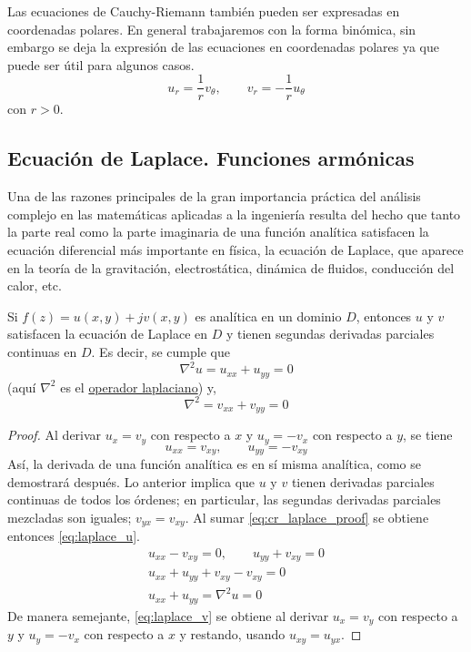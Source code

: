 Las ecuaciones de Cauchy-Riemann también pueden ser expresadas en coordenadas polares. En general trabajaremos con la forma binómica, sin embargo se deja la expresión de las ecuaciones en coordenadas polares ya que puede ser útil para algunos casos.
\begin{equation}
  u_r = \frac{1}{r}v_\theta, \qquad v_r =  -\frac{1}{r}u_\theta
\end{equation} 
con $r>0$.

\subsection{Ecuación de Laplace. Funciones armónicas}\label{sec:laplace_eq}

Una de las razones principales de la gran importancia práctica del análisis complejo en las matemáticas aplicadas a la ingeniería resulta del hecho que tanto la parte real como la parte imaginaria de una función analítica satisfacen la ecuación diferencial más importante en física, la ecuación de Laplace, que aparece en la teoría de la gravitación, electrostática, dinámica de fluidos, conducción del calor, etc.

\begin{theorem}
  Si $f(z)=u(x,y)+jv(x,y)$ es analítica en un dominio $D$, entonces $u$ y $v$ satisfacen la ecuación de Laplace en $D$ y tienen segundas derivadas parciales continuas en $D$. Es decir, se cumple que
  \begin{equation}\label{eq:laplace_u}
    \nabla^2 u = u_{xx} + u_{yy} = 0
  \end{equation}
  (aquí $\nabla^2$ es el \href{https://en.wikipedia.org/wiki/Laplace_operator}{operador laplaciano}) y,
  \begin{equation}\label{eq:laplace_v}
    \nabla^2 = v_{xx} + v_{yy} = 0
  \end{equation}
\end{theorem}

\begin{proof}
  Al derivar $u_x = v_y$ con respecto a $x$ y $u_y=-v_x$ con respecto a $y$, se tiene
  \begin{equation}\label{eq:cr_laplace_proof}
    u_{xx}=v_{xy}, \qquad u_{yy} = -v_{xy}
  \end{equation}
  Así, la derivada de una función analítica es en sí misma analítica, como se demostrará después. Lo anterior implica que $u$ y $v$ tienen derivadas parciales continuas de todos los órdenes; en particular, las segundas derivadas parciales mezcladas son iguales; $v_{yx}= v_{xy}$. Al sumar \ref{eq:cr_laplace_proof} se obtiene entonces \ref{eq:laplace_u}.
  \begin{gather*}
    u_{xx}-v_{xy}=0, \qquad u_{yy}+v_{xy}=0 \\ 
    u_{xx}+u_{yy}+v_{xy}-v_{xy}=0 \\ 
    u_{xx}+u_{yy}=\nabla^2 u=0 
  \end{gather*}
  De manera semejante, \ref{eq:laplace_v} se obtiene al derivar $u_x=v_y$ con respecto a $y$ y $u_y=-v_x$ con respecto a $x$ y restando, usando $u_{xy}=u_{yx}$.
\end{proof}

